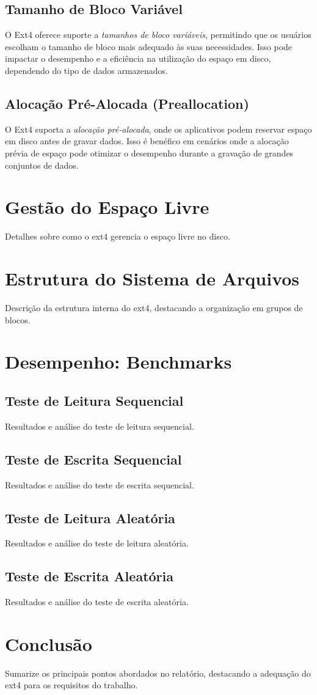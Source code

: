 \documentclass[
	12pt,				%
	openright,			%
	oneside,			%
	a4paper,			%
	chapter=TITLE,		%
	english,			%
	french,				%
	spanish,			%
	brazil				%
	]{abntex2}
\theoremstyle{definition}
\begin{document}
\section{Tamanho de Bloco Variável}
O Ext4 oferece suporte a \textit{tamanhos de bloco variáveis}, permitindo que os usuários escolham o tamanho de bloco mais adequado às suas necessidades. Isso pode impactar o desempenho e a eficiência na utilização do espaço em disco, dependendo do tipo de dados armazenados.

\section{Alocação Pré-Alocada (Preallocation)}
O Ext4 suporta a \textit{alocação pré-alocada}, onde os aplicativos podem reservar espaço em disco antes de gravar dados. Isso é benéfico em cenários onde a alocação prévia de espaço pode otimizar o desempenho durante a gravação de grandes conjuntos de dados.

\chapter{Gestão do Espaço Livre}
Detalhes sobre como o ext4 gerencia o espaço livre no disco.

\chapter{Estrutura do Sistema de Arquivos}
Descrição da estrutura interna do ext4, destacando a organização em grupos de blocos.

\chapter{Desempenho: Benchmarks}

\section{Teste de Leitura Sequencial}
Resultados e análise do teste de leitura sequencial.

\section{Teste de Escrita Sequencial}
Resultados e análise do teste de escrita sequencial.

\section{Teste de Leitura Aleatória}
Resultados e análise do teste de leitura aleatória.

\section{Teste de Escrita Aleatória}
Resultados e análise do teste de escrita aleatória.

\chapter{Conclusão}
Sumarize os principais pontos abordados no relatório, destacando a adequação do ext4 para os requisitos do trabalho.

\postextual



\cite{tanenbaum2010sistemas}
\end{document}
